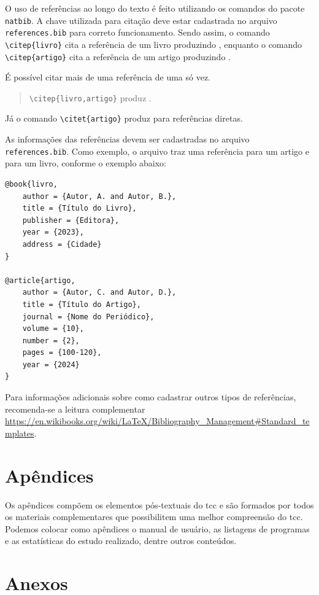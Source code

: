 \documentclass{eic-bcc-tcc}
\begin{document}
O uso de referências ao longo do texto é feito utilizando os comandos do pacote \texttt{natbib}. A chave utilizada para citação deve estar cadastrada no arquivo \texttt{references.bib} para correto funcionamento. Sendo assim, o comando \verb|\citep{livro}| cita a referência de um livro produzindo \citep{livro}, enquanto o comando \verb|\citep{artigo}| cita a referência de um artigo produzindo \citep{artigo}.

É possível citar mais de uma referência de uma só vez.

\begin{quote}
\verb|\citep{livro,artigo}| produz \citep{livro,artigo}.
\end{quote}

Já o comando \verb|\citet{artigo}| produz \citet{artigo} para referências diretas.

As informações das referências devem ser cadastradas no arquivo \texttt{references.bib}. Como exemplo, o arquivo traz uma referência para um artigo e para um livro, conforme o exemplo abaixo:
\begin{verbatim}
@book{livro,
    author = {Autor, A. and Autor, B.},
    title = {Título do Livro},
    publisher = {Editora},
    year = {2023},
    address = {Cidade}
}

@article{artigo,
    author = {Autor, C. and Autor, D.},
    title = {Título do Artigo},
    journal = {Nome do Periódico},
    volume = {10},
    number = {2},
    pages = {100-120},
    year = {2024}
}
\end{verbatim}

Para informações adicionais sobre como cadastrar outros tipos de referências, recomenda-se a leitura complementar \url{https://en.wikibooks.org/wiki/LaTeX/Bibliography_Management#Standard_templates}.


\section{Apêndices}

Os apêndices compõem os elementos pós-textuais do \gls{tcc} e são formados por todos os materiais complementares que possibilitem uma melhor compreensão do \gls{tcc}. Podemos colocar como apêndices o manual de usuário, as listagens de programas e as estatísticas do estudo realizado, dentre outros conteúdos.

\section{Anexos}
\end{document}
